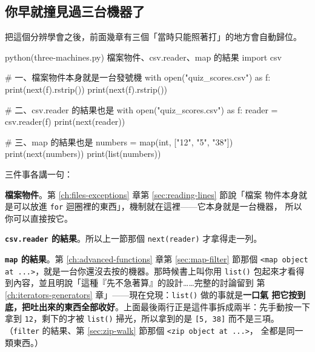 \subsection*{你早就撞見過三台機器了}

把這個分辨學會之後，前面幾章有三個「當時只能照著打」的地方會自動歸位。

\begin{example}{python}{(three-machines.py) 檔案物件、csv.reader、map 的結果}
import csv

# 一、檔案物件本身就是一台發號機
with open("quiz_scores.csv") as f:
    print(next(f).rstrip())
    print(next(f).rstrip())

# 二、csv.reader 的結果也是
with open("quiz_scores.csv") as f:
    reader = csv.reader(f)
    print(next(reader))

# 三、map 的結果也是
numbers = map(int, ["12", "5", "38"])
print(next(numbers))
print(list(numbers))
\end{example}


三件事各講一句：

\textbf{檔案物件}。第 \ref{ch:files-exceptions} 章第 \ref{sec:reading-lines} 節說「檔案
物件本身就是可以放進 \texttt{for} 迴圈裡的東西」，機制就在這裡——它本身就是一台機器，
所以你可以直接按它。

\textbf{\texttt{csv.reader} 的結果}。所以上一節那個 \texttt{next(reader)} 才拿得走一列。

\textbf{\texttt{map} 的結果}。第 \ref{ch:advanced-functions} 章第 \ref{sec:map-filter}
節那個 \texttt{<map object at ...>}，就是一台你還沒去按的機器。那時候書上叫你用
\texttt{list()} 包起來才看得到內容，並且明說「這種『先不急著算』的設計……完整的討論留到
第 \ref{ch:iterators-generators} 章」——現在兌現：\texttt{list()} 做的事就是\textbf{一口氣
把它按到底，把吐出來的東西全部收好}。上面最後兩行正是這件事拆成兩半：先手動按一下拿到
\texttt{12}，剩下的才被 \texttt{list()} 掃光，所以拿到的是 \texttt{[5, 38]} 而不是三項。
（\texttt{filter} 的結果、第 \ref{sec:zip-walk} 節那個 \texttt{<zip object at ...>}，
全都是同一類東西。）

